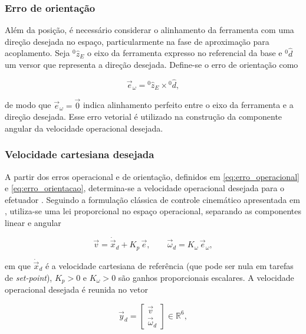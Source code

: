 \subsubsection{Erro de orientação}

Além da posição, é necessário considerar o alinhamento da ferramenta com uma direção desejada no espaço, particularmente na fase de aproximação para acoplamento.
Seja ${}^{0}\!\hat{z}_{E}$ o eixo da ferramenta expresso no referencial da base e ${}^{0}\!\hat{d}$ um versor que representa a direção desejada.
Define-se o erro de orientação como

\begin{equation}
\label{eq:erro_orientacao}
\vec{e}_{\omega}
=
{}^{0}\!\hat{z}_{E}
\times
{}^{0}\!\hat{d},
\end{equation}

de modo que $\vec{e}_{\omega} = \vec{0}$ indica alinhamento perfeito entre o eixo da ferramenta e a direção desejada. Esse erro vetorial é utilizado na construção da componente angular da velocidade operacional desejada.


\subsubsection{Velocidade cartesiana desejada}

A partir dos erros operacional e de orientação, definidos em \eqref{eq:erro_operacional} e \eqref{eq:erro_orientacao}, determina-se a velocidade operacional desejada para o efetuador \cite{sciavicco_siciliano2010}.
Seguindo a formulação clássica de controle cinemático apresentada em \cite{sciavicco_siciliano2010}, utiliza-se uma lei proporcional no espaço operacional, separando as componentes linear e angular

\begin{equation}
\label{eq:velocidade_cartesiana_desejada}
\vec{v}
=
\dot{\vec{x}}_{d}
+
K_{p}\,\vec{e},
\qquad
\vec{\omega}_{d}
=
K_{\omega}\,\vec{e}_{\omega},
\end{equation}

em que $\dot{\vec{x}}_{d}$ é a velocidade cartesiana de referência (que pode ser nula em tarefas de \emph{set-point}), $K_{p}>0$ e $K_{\omega}>0$ são ganhos proporcionais escalares.
A velocidade operacional desejada é reunida no vetor

\begin{equation}
\label{eq:velocidade_operacional_desejada}
\vec{y}_{d}
=
\begin{bmatrix}
\vec{v} \\
\vec{\omega}_{d}
\end{bmatrix}
\in \mathbb{R}^{6},
\end{equation}

